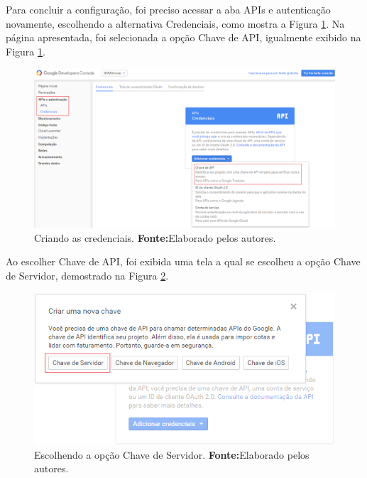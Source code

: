 	\pagebreak

	\par Para concluir a configuração, foi preciso acessar a aba APIs e
autenticação novamente, escolhendo a alternativa Credenciais, como mostra a
Figura \ref{fig:gcm6}. Na página apresentada, foi selecionada a opção Chave de
API, igualmente exibido na Figura \ref{fig:gcm6}.

	\begin{figure}[h!] 
		\centerline{\includegraphics[scale=0.4]{./imagens/2_q_metodologico/4_procedimentos_resultados/41_gcm/gcm6.png}}
		\caption[Criando as credenciais]{Criando as credenciais.
		\textbf{Fonte:}Elaborado pelos autores.}
		\label{fig:gcm6}
	\end{figure}
	
	\par Ao escolher Chave de API, foi exibida uma tela a qual se escolheu a opção
Chave de Servidor, demostrado na Figura \ref{fig:gcm7}.

	\begin{figure}[h!] 
		\centerline{\includegraphics[scale=0.7]{./imagens/2_q_metodologico/4_procedimentos_resultados/41_gcm/gcm7.png}}
		\caption[Escolhendo a opção Chave de Servidor]{Escolhendo a opção Chave de Servidor.
		\textbf{Fonte:}Elaborado pelos autores.}
		\label{fig:gcm7}
	\end{figure}

